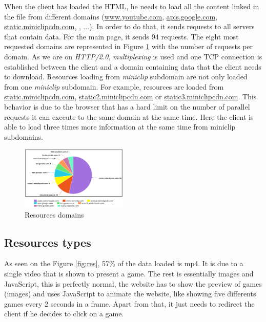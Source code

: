 \documentclass{article}
\begin{document}
When the client has loaded the HTML, he needs to load all the content linked in the file from different domains (\url{www.youtube.com}, \url{apis.google.com}, \url{static.miniclipcdn.com}, , ...). In order to do that, it sends requests to all servers that contain data. For the main page, it sends 94 requests. The eight most requested domains are represented in Figure \ref{fig:resdom} with the number of requests per domain. As we are on \textit{HTTP/2.0}, \textit{multiplexing} is used and one TCP connection is established between the client and a domain containing data that the client needs to download.
Resources loading from \textit{miniclip} subdomain are not only loaded from one \textit{miniclip} subdomain. For example, resources are loaded from \url{static.miniclipcdn.com}, \url{static2.miniclipcdn.com} or \url{static3.miniclipcdn.com}. This behavior is due to the browser that has a hard limit on the number of parallel requests it can execute to the same domain at the same time. Here the client is able to load three times more information at the same time from miniclip subdomains.

\begin{figure}[h!]
    \centering
    \includegraphics[width=0.45\textwidth]{res/imgs/domains.png}
    \caption{Resources domains}
    \label{fig:resdom}
\end{figure}

\subsection{Resources types}
\label{sub:res}

As seen on the Figure \ref{fig:res}, 57\% of the data loaded is mp4. It is due to a single video that is shown to present a game. The rest is essentially images and JavaScript, this is perfectly normal, the website has to show the preview of games (images) and uses JavaScript to animate the website, like showing five differents games every 2 seconds in a frame. Apart from that, it just needs to redirect the client if he decides to click on a game.
\end{document}
